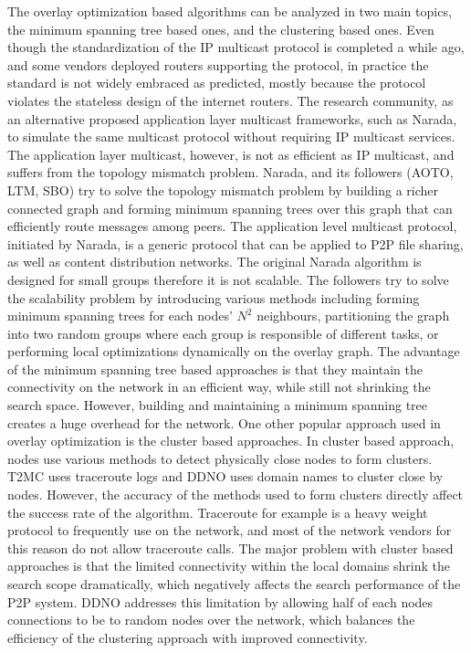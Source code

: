 \documentclass[acmcsur]{acmtrans2m}
\begin{document}
The overlay optimization based algorithms can be analyzed in
two main topics, the minimum spanning tree based ones, and the clustering based ones.
Even though the standardization of the IP multicast protocol is completed a
while ago, and some vendors deployed routers supporting the protocol, in
practice the standard is not widely embraced as predicted, mostly because the
protocol violates the stateless design of the internet routers. The research
community, as an alternative proposed application layer multicast frameworks,
such as Narada, to simulate the same multicast protocol without requiring IP
multicast services. The application layer multicast, however, is not as
efficient as IP multicast, and suffers from the topology mismatch problem.
Narada, and its followers (AOTO, LTM, SBO) try to solve the topology mismatch
problem by building a richer connected graph and forming minimum spanning trees
over this graph that can efficiently route messages among peers. The application
level multicast protocol, initiated by Narada, is a generic protocol that can be
applied to P2P file sharing, as well as content distribution networks. The
original Narada algorithm is designed for small groups therefore it is not
scalable. The followers try to solve the scalability problem by introducing
various methods including forming minimum spanning trees for each nodes' $N^2$
neighbours, partitioning the graph into two random groups where each group is
responsible of different tasks, or performing local optimizations dynamically on
the overlay graph. The advantage of the minimum spanning tree based approaches
is that they maintain the connectivity on the network in an efficient way, while
still not shrinking the search space. However, building and maintaining a
minimum spanning tree creates a huge overhead for the network. 
One other popular approach used in overlay optimization is the cluster based
approaches. In cluster based approach, nodes use various methods to detect
physically close nodes to form clusters. T2MC uses traceroute logs and DDNO uses
domain names to cluster close by nodes. However, the accuracy of the methods
used to form clusters directly affect the success rate of the algorithm. Traceroute for
example is a heavy weight protocol to frequently use on the network, and most of
the network vendors for this reason do not allow traceroute calls. The major problem with
cluster based approaches is that the limited connectivity within the local
domains shrink the search scope dramatically, which negatively affects the
search performance of the P2P system. DDNO addresses this limitation by allowing
half of each nodes connections to be to random nodes over the network, which
balances the efficiency of the clustering approach with improved connectivity.
\end{document}
